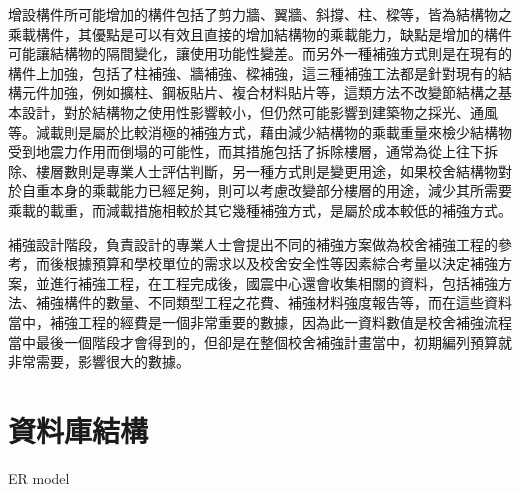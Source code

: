 增設構件所可能增加的構件包括了剪力牆、翼牆、斜撐、柱、樑等，皆為結構物之乘載構件，其優點是可以有效且直接的增加結構物的乘載能力，缺點是增加的構件可能讓結構物的隔間變化，讓使用功能性變差。而另外一種補強方式則是在現有的構件上加強，包括了柱補強、牆補強、樑補強，這三種補強工法都是針對現有的結構元件加強，例如擴柱、鋼板貼片、複合材料貼片等，這類方法不改變節結構之基本設計，對於結構物之使用性影響較小，但仍然可能影響到建築物之採光、通風等。減載則是屬於比較消極的補強方式，藉由減少結構物的乘載重量來檢少結構物受到地震力作用而倒塌的可能性，而其措施包括了拆除樓層，通常為從上往下拆除、樓層數則是專業人士評估判斷，另一種方式則是變更用途，如果校舍結構物對於自重本身的乘載能力已經足夠，則可以考慮改變部分樓層的用途，減少其所需要乘載的載重，而減載措施相較於其它幾種補強方式，是屬於成本較低的補強方式。

補強設計階段，負責設計的專業人士會提出不同的補強方案做為校舍補強工程的參考，而後根據預算和學校單位的需求以及校舍安全性等因素綜合考量以決定補強方案，並進行補強工程，在工程完成後，國震中心還會收集相關的資料，包括補強方法、補強構件的數量、不同類型工程之花費、補強材料強度報告等，而在這些資料當中，補強工程的經費是一個非常重要的數據，因為此一資料數值是校舍補強流程當中最後一個階段才會得到的，但卻是在整個校舍補強計畫當中，初期編列預算就非常需要，影響很大的數據。

\section{資料庫結構}

ER model






